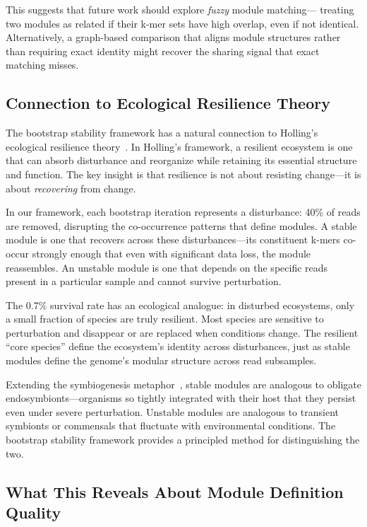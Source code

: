 \documentclass{../yalumba}
\begin{document}
This suggests that future work should explore \emph{fuzzy} module matching---
treating two modules as related if their k-mer sets have high overlap, even if
not identical.  Alternatively, a graph-based comparison that aligns module
structures rather than requiring exact identity might recover the sharing signal
that exact matching misses.

\subsection{Connection to Ecological Resilience Theory}

The bootstrap stability framework has a natural connection to Holling's
ecological resilience theory~\cite{holling1973resilience}.  In Holling's
framework, a resilient ecosystem is one that can absorb disturbance and
reorganize while retaining its essential structure and function.  The key
insight is that resilience is not about resisting change---it is about
\emph{recovering} from change.


In our framework, each bootstrap iteration represents a disturbance: 40\% of
reads are removed, disrupting the co-occurrence patterns that define modules.
A stable module is one that recovers across these disturbances---its
constituent k-mers co-occur strongly enough that even with significant data
loss, the module reassembles.  An unstable module is one that depends on the
specific reads present in a particular sample and cannot survive perturbation.

The 0.7\% survival rate has an ecological analogue: in disturbed ecosystems,
only a small fraction of species are truly resilient.  Most species are
sensitive to perturbation and disappear or are replaced when conditions change.
The resilient ``core species'' define the ecosystem's identity across
disturbances, just as stable modules define the genome's modular structure
across read subsamples.

Extending the symbiogenesis metaphor~\cite{margulis1998}, stable modules are
analogous to obligate endosymbionts---organisms so tightly integrated with
their host that they persist even under severe perturbation.  Unstable modules
are analogous to transient symbionts or commensals that fluctuate with
environmental conditions.  The bootstrap stability framework provides a
principled method for distinguishing the two.

\subsection{What This Reveals About Module Definition Quality}
\end{document}
